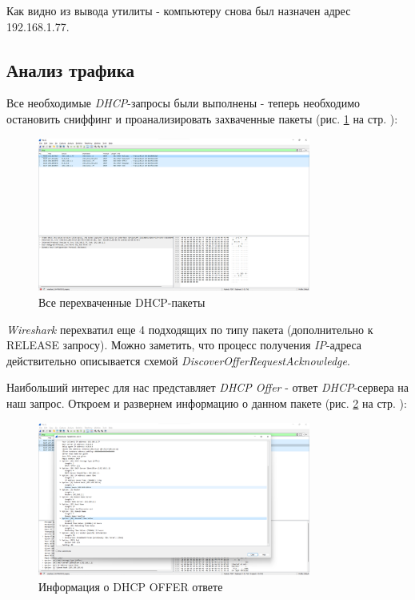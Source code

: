 \documentclass[a4paper]{article}
\begin{document}
  Как видно из вывода утилиты - компьютеру снова был назначен адрес 192.168.1.77.

  \subsection{Анализ трафика}

  Все необходимые \textit{DHCP}-запросы были выполнены - теперь необходимо остановить
  сниффинг и проанализировать захваченные пакеты (рис. \ref{img:0008} на стр. \pageref{img:0008}):

  \begin{figure}[H]
    \centering
    \includegraphics[width=0.8\textwidth]{04_00 (8)}
    \caption{Все перехваченные DHCP-пакеты}
    \label{img:0008}
  \end{figure}

  \textit{Wireshark} перехватил еще 4 подходящих по типу пакета (дополнительно к RELEASE запросу).
  Можно заметить, что процесс получения \textit{IP}-адреса действительно описывается
  схемой \textit{DiscoverOfferRequestAcknowledge}.

  Наибольший интерес для нас представляет \textit{DHCP Offer} - ответ \textit{DHCP}-сервера
  на наш запрос. Откроем и развернем информацию о данном пакете (рис. \ref{img:0009} на стр. \pageref{img:0009}):

  \begin{figure}[H]
    \centering
    \includegraphics[width=0.8\textwidth]{04_00 (15)}
    \caption{Информация о DHCP OFFER ответе}
    \label{img:0009}
  \end{figure}
\end{document}
